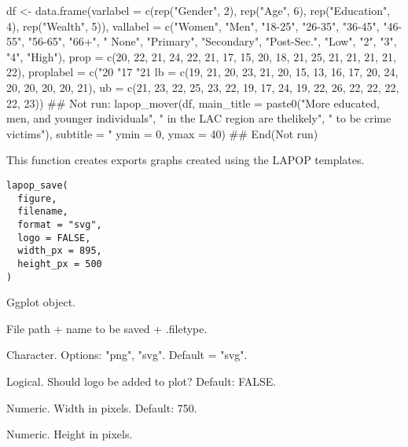 \documentclass[a4paper]{book}
\begin{document}
\begin{Examples}
\begin{ExampleCode}

df <- data.frame(varlabel = c(rep("Gender", 2), rep("Age", 6),
                              rep("Education", 4), rep("Wealth", 5)),
                 vallabel = c("Women", "Men", "18-25", "26-35", "36-45",
                              "46-55", "56-65", "66+", "  None", "Primary",
                              "Secondary", "Post-Sec.", "Low", "2",
                              "3", "4", "High"),
                 prop = c(20, 22, 21, 24, 22, 21, 17, 15, 20, 18, 21, 25, 21,
                          21, 21, 21, 22),
                 proplabel = c("20%
                               "17%
                               "21%
                 lb = c(19, 21, 20, 23, 21, 20, 15, 13, 16, 17, 20, 24, 20,
                        20, 20, 20, 21),
                 ub = c(21, 23, 22, 25, 23, 22, 19, 17, 24, 19, 22, 26, 22,
                        22, 22, 22, 23))
## Not run: 
lapop_mover(df,
            main_title = paste0("More educated, men, and younger individuals",
                                " in the LAC region are the\nmost likely",
                                  " to be crime victims"),
            subtitle = "%
            ymin = 0,
            ymax = 40)
## End(Not run)
\end{ExampleCode}
\end{Examples}
%
\begin{Description}
This function creates exports graphs created using the LAPOP templates.
\end{Description}
%
\begin{Usage}
\begin{verbatim}
lapop_save(
  figure,
  filename,
  format = "svg",
  logo = FALSE,
  width_px = 895,
  height_px = 500
)
\end{verbatim}
\end{Usage}
%
\begin{Arguments}
\begin{ldescription}
\item[\code{figure}] Ggplot object.

\item[\code{filename}] File path + name to be saved + .filetype.

\item[\code{format}] Character.  Options: "png", "svg". Default = "svg".

\item[\code{logo}] Logical.  Should logo be added to plot?  Default: FALSE.

\item[\code{width\_px}] Numeric. Width in pixels.  Default: 750.

\item[\code{height\_px}] Numeric.  Height in pixels.
\end{ldescription}
\end{Arguments}
\end{document}

